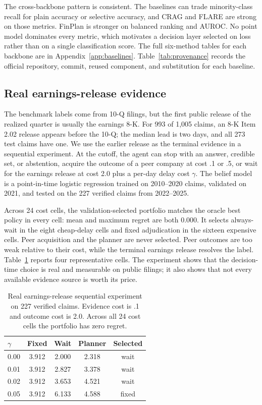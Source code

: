 \documentclass[11pt]{article}
\newcommand{\method}{FinPlan}
\begin{document}
The cross-backbone pattern is consistent. The baselines can trade minority-class recall for plain accuracy or selective accuracy, and CRAG and FLARE are strong on those metrics. \method{} is stronger on balanced ranking and AUROC. No point model dominates every metric, which motivates a decision layer selected on loss rather than on a single classification score. The full six-method tables for each backbone are in Appendix~\ref{app:baselines}. Table~\ref{tab:provenance} records the official repository, commit, reused component, and substitution for each baseline.

\subsection{Real earnings-release evidence}
The benchmark labels come from 10-Q filings, but the first public release of the realized quarter is usually the earnings 8-K. For 993 of 1,005 claims, an 8-K Item 2.02 release appears before the 10-Q; the median lead is two days, and all 273 test claims have one. We use the earlier release as the terminal evidence in a sequential experiment. At the cutoff, the agent can stop with an answer, credible set, or abstention, acquire the outcome of a peer company at cost .1 or .5, or wait for the earnings release at cost 2.0 plus a per-day delay cost $\gamma$. The belief model is a point-in-time logistic regression trained on 2010--2020 claims, validated on 2021, and tested on the 227 verified claims from 2022--2025.

Across 24 cost cells, the validation-selected portfolio matches the oracle best policy in every cell: mean and maximum regret are both $0.000$. It selects always-wait in the eight cheap-delay cells and fixed adjudication in the sixteen expensive cells. Peer acquisition and the planner are never selected. Peer outcomes are too weak relative to their cost, while the terminal earnings release resolves the label. Table~\ref{tab:sequential} reports four representative cells. The experiment shows that the decision-time choice is real and measurable on public filings; it also shows that not every available evidence source is worth its price.

\begin{table}[t]
\centering
\small
\setlength{\tabcolsep}{3pt}
\begin{tabular}{lcccc}
\toprule
$\gamma$ & Fixed & Wait & Planner & Selected \\
\midrule
0.00 & 3.912 & 2.000 & 2.318 & wait \\
0.01 & 3.912 & 2.827 & 3.378 & wait \\
0.02 & 3.912 & 3.653 & 4.521 & wait \\
0.05 & 3.912 & 6.133 & 4.588 & fixed \\
\bottomrule
\end{tabular}
\caption{Real earnings-release sequential experiment on 227 verified claims. Evidence cost is .1 and outcome cost is 2.0. Across all 24 cost cells the portfolio has zero regret.}
\label{tab:sequential}
\end{table}
\end{document}
